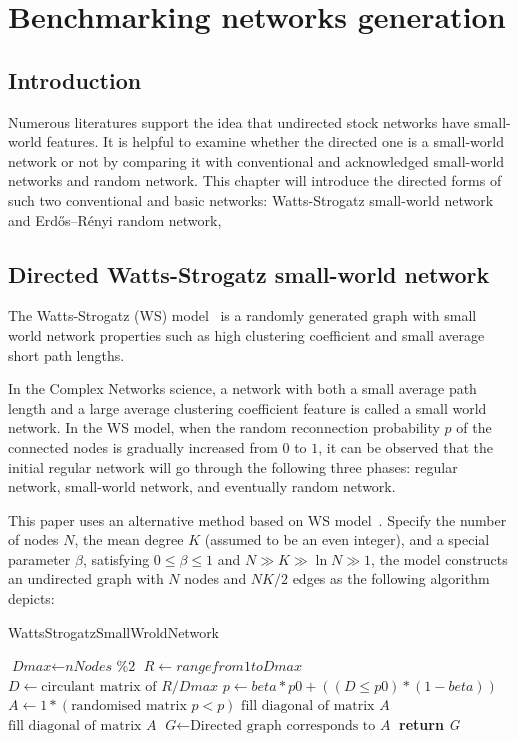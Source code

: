 \chapter{Benchmarking networks generation}
\section{Introduction}
Numerous literatures support the idea that undirected stock networks have small-world features. It is helpful to examine whether the directed one is a small-world network or not by comparing it with conventional and acknowledged small-world networks and random network. This chapter will introduce the directed forms of such two conventional and basic networks: Watts-Strogatz small-world network and Erdős–Rényi random network, 

\section{Directed Watts-Strogatz small-world network}
The Watts-Strogatz (WS) model~\cite{watts1998collective} is a randomly generated graph with small world network properties such as high clustering coefficient and small average short path lengths.

In the Complex Networks science, a network with both a small average path length and a large average clustering coefficient feature is called a small world network. In the WS model, when the random reconnection probability $p$ of the connected nodes is gradually increased from $0$ to $1$, it can be observed that the initial regular network will go through the following three phases: regular network, small-world network, and eventually random network.

This paper uses an alternative method based on WS model~\cite{song2014simple}. Specify the number of nodes $N$, the mean degree $K$ (assumed to be an even integer), and a special parameter $\beta$, satisfying $0\leq \beta \leq 1$ and $N\gg K\gg \ln N\gg 1$, the model constructs an undirected graph with $N$ nodes and ${NK}/{2}$ edges as the following algorithm depicts:

\begin{algorithm}[H]
	\caption{WattsStrogatzSmallWroldNetwork}\label{alg:smallworld}
	\begin{algorithmic}[1]
		\State $\textit{Dmax} \gets \textit{nNodes \% 2}$
		\State $\textit{R} \gets range from 1 to \textit{Dmax}$
		\State $\textit{D} \gets \text{circulant matrix of } \textit{R}/\textit{Dmax}$
		\State $\textit{p} \gets \textit{beta}*\textit{p0}+((\textit{D} \leq \textit{p0})*(1-\textit{beta}))$
		\State $\textit{A} \gets 1*(\text{randomised matrix }\textit{p} < p)$
		\State $\text{fill diagonal of matrix }\textit{A}$
		\State $\text{fill diagonal of matrix }\textit{A}$
		\State $\textit{G} \gets \text{Directed graph corresponds to }\textit{A}$
		\State \textbf{return} {\textit{G}}
		\EndProcedure
	\end{algorithmic}
\end{algorithm}


